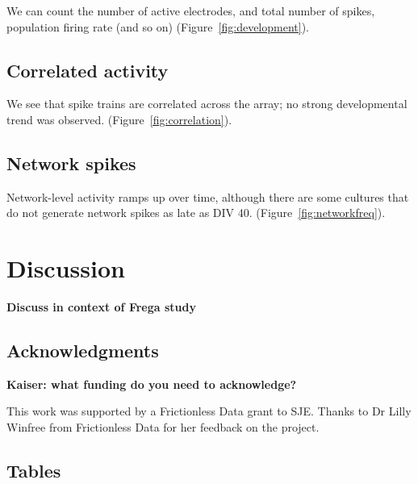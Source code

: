 \documentclass[11pt]{article}
\begin{document}
{We can count the number of active electrodes, and total number of
spikes, population firing rate (and so on)
(Figure~\ref{fig:development}).


\subsection*{Correlated activity}

We see that spike trains are correlated across the array; no
strong developmental trend was observed.
(Figure~\ref{fig:correlation}).

\subsection*{Network spikes}

Network-level activity ramps up over time, although there are some
cultures that do not generate network spikes as late as DIV 40.
(Figure~\ref{fig:networkfreq}).





\clearpage
\section*{Discussion}


\textbf{Discuss in context of Frega study}  \cite{Frega2019}
\vspace*{1cm}

\subsection*{Acknowledgments}

\textbf{Kaiser: what funding do you need to acknowledge?}


This work was supported by a Frictionless Data grant to SJE\@.  Thanks
to Dr Lilly Winfree from Frictionless Data for her feedback on the
project.

\clearpage





\label{LastPage}
\clearpage
\pagestyle{empty}


\subsection*{Tables}


\clearpage

}
\end{document}

